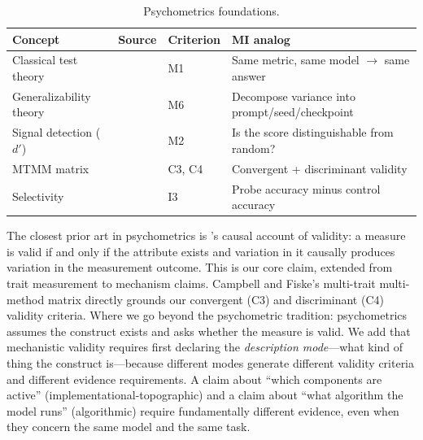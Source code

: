 \documentclass[10pt]{article}
\begin{document}
\begin{table}[H]
\centering\small
\caption{Psychometrics foundations.}
\renewcommand{\arraystretch}{1.12}
\begin{tabular}{@{}l>{\raggedright\arraybackslash}p{2.2cm}l>{\raggedright\arraybackslash}p{4.5cm}@{}}
\toprule
\textbf{Concept} & \textbf{Source} & \textbf{Criterion} & \textbf{MI analog} \\
\midrule
Classical test theory & \citet{lord1968statistical} & M1 & Same metric, same model $\to$ same answer \\
\midrule
Generalizability theory & \citet{cronbach1972dependability} & M6 & Decompose variance into prompt/seed/checkpoint \\
\midrule
Signal detection ($d'$) & \citet{green1966signal} & M2 & Is the score distinguishable from random? \\
\midrule
MTMM matrix & \citet{campbell1959convergent} & C3, C4 & Convergent + discriminant validity \\
\midrule
Selectivity & \citet{hewitt2019designing} & I3 & Probe accuracy minus control accuracy \\
\bottomrule
\end{tabular}
\end{table}

The closest prior art in psychometrics is \citet{borsboom2004concept}'s causal account of validity: a measure is valid if and only if the attribute exists and variation in it causally produces variation in the measurement outcome. This is our core claim, extended from trait measurement to mechanism claims. Campbell and Fiske's \citep{campbell1959convergent} multi-trait multi-method matrix directly grounds our convergent (C3) and discriminant (C4) validity criteria. Where we go beyond the psychometric tradition: psychometrics assumes the construct exists and asks whether the measure is valid. We add that mechanistic validity requires first declaring the \emph{description mode}---what kind of thing the construct is---because different modes generate different validity criteria and different evidence requirements. A claim about ``which components are active'' (implementational-topographic) and a claim about ``what algorithm the model runs'' (algorithmic) require fundamentally different evidence, even when they concern the same model and the same task.
\end{document}
